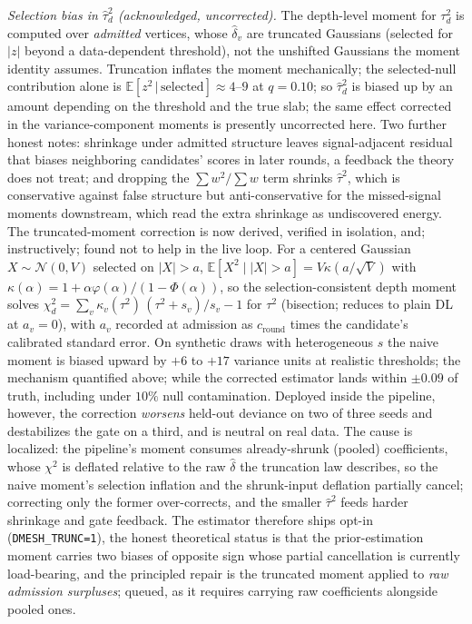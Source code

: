 \documentclass[11pt]{article}
\begin{document}
\noindent\emph{Selection bias in $\hat\tau_d^2$ (acknowledged, uncorrected).}
The depth-level moment for $\tau_d^2$ is computed over \emph{admitted}
vertices, whose $\hat\delta_v$ are truncated Gaussians (selected for $|z|$
beyond a data-dependent threshold), not the unshifted Gaussians the moment
identity assumes. Truncation inflates the moment mechanically; the
selected-null contribution alone is $\mathbb{E}[z^2\,|\,\text{selected}]
\approx4$--$9$ at $q=0.10$; so $\hat\tau_d^2$ is biased up by an amount
depending on the threshold and the true slab; the same effect corrected in
the variance-component moments is presently uncorrected here. Two further
honest notes: shrinkage under admitted structure leaves signal-adjacent
residual that biases neighboring candidates' scores in later rounds, a
feedback the theory does not treat; and dropping the $\sum w^2/\sum w$ term
shrinks $\hat\tau^2$, which is conservative against false structure but
anti-conservative for the missed-signal moments downstream, which read the
extra shrinkage as undiscovered energy. The truncated-moment correction is now derived,
verified in isolation, and; instructively; found not to help in the
live loop. For a centered Gaussian $X\sim\mathcal N(0,V)$ selected on
$|X|>a$, $\mathbb E[X^2\mid|X|>a]=V\kappa(a/\sqrt V)$ with
$\kappa(\alpha)=1+\alpha\varphi(\alpha)/(1-\Phi(\alpha))$, so the
selection-consistent depth moment solves
$\chi^2_d=\sum_v\kappa_v(\tau^2)\,(\tau^2+s_v)/s_v-1$ for $\tau^2$
(bisection; reduces to plain DL at $a_v=0$), with $a_v$ recorded at
admission as $c_{\mathrm{round}}$ times the candidate's calibrated standard
error. On synthetic draws with heterogeneous $s$ the naive moment is biased
upward by $+6$ to $+17$ variance units at realistic thresholds; the
mechanism quantified above; while the corrected estimator lands within
$\pm0.09$ of truth, including under $10\%$ null contamination. Deployed
inside the pipeline, however, the correction \emph{worsens} held-out
deviance on two of three seeds and destabilizes the gate on a third, and is
neutral on real data. The cause is localized: the pipeline's moment consumes
already-shrunk (pooled) coefficients, whose $\chi^2$ is deflated relative to
the raw $\hat\delta$ the truncation law describes, so the naive moment's
selection inflation and the shrunk-input deflation partially cancel;
correcting only the former over-corrects, and the smaller $\hat\tau^2$
feeds harder shrinkage and gate feedback. The estimator therefore ships
opt-in (\texttt{DMESH\_TRUNC=1}), the honest theoretical status is that the
prior-estimation moment carries two biases of opposite sign whose partial
cancellation is currently load-bearing, and the principled repair is the
truncated moment applied to \emph{raw admission surpluses}; queued, as it
requires carrying raw coefficients alongside pooled ones.
\end{document}
